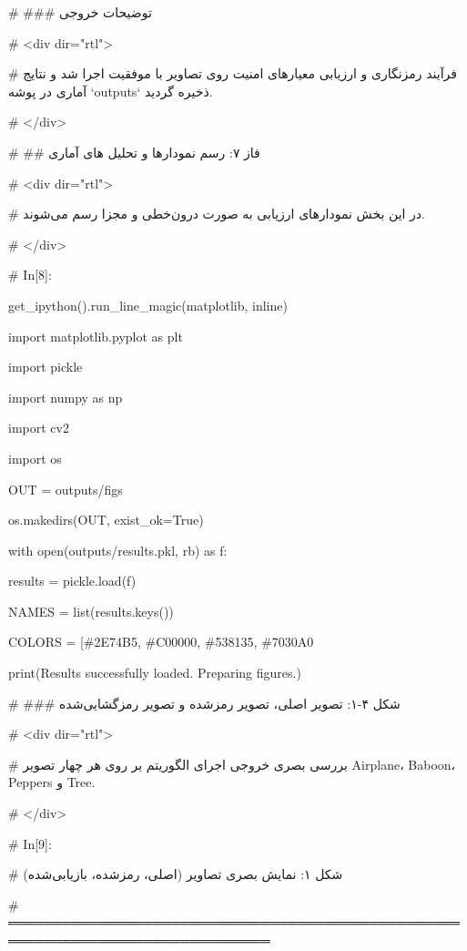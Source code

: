 \# \#\#\# توضیحات خروجی

\# \textless div dir="rtl"\textgreater{}

\# فرآیند رمزنگاری و ارزیابی معیارهای امنیت روی تصاویر با موفقیت اجرا شد و نتایج آماری در پوشه `outputs` ذخیره گردید.

\# \textless/div\textgreater{}

\# \#\# فاز ۷: رسم نمودارها و تحلیل های آماری

\# \textless div dir="rtl"\textgreater{}

\# در این بخش نمودارهای ارزیابی به صورت درون‌خطی و مجزا رسم می‌شوند.

\# \textless/div\textgreater{}

\# In{[}8{]}:

get\_ipython().run\_line\_magic(\textquotesingle matplotlib\textquotesingle, \textquotesingle inline\textquotesingle)

import matplotlib.pyplot as plt

import pickle

import numpy as np

import cv2

import os

OUT = \textquotesingle outputs/figs\textquotesingle{}

os.makedirs(OUT, exist\_ok=True)

with open(\textquotesingle outputs/results.pkl\textquotesingle, \textquotesingle rb\textquotesingle) as f:

results = pickle.load(f)

NAMES = list(results.keys())

COLORS = {[}\textquotesingle\#2E74B5\textquotesingle, \textquotesingle\#C00000\textquotesingle, \textquotesingle\#538135\textquotesingle, \textquotesingle\#7030A0\textquotesingle{]}

print(\textquotesingle Results successfully loaded. Preparing figures.\textquotesingle)

\# \#\#\# شکل ۴-۱: تصویر اصلی، تصویر رمزشده و تصویر رمزگشایی‌شده

\# \textless div dir="rtl"\textgreater{}

\# بررسی بصری خروجی اجرای الگوریتم بر روی هر چهار تصویر Airplane، Baboon، Peppers و Tree.

\# \textless/div\textgreater{}

\# In{[}9{]}:

\# شکل ۱: نمایش بصری تصاویر (اصلی، رمزشده، بازیابی‌شده)

\# ═══════════════════════════════════════════════════════════════════════════════

